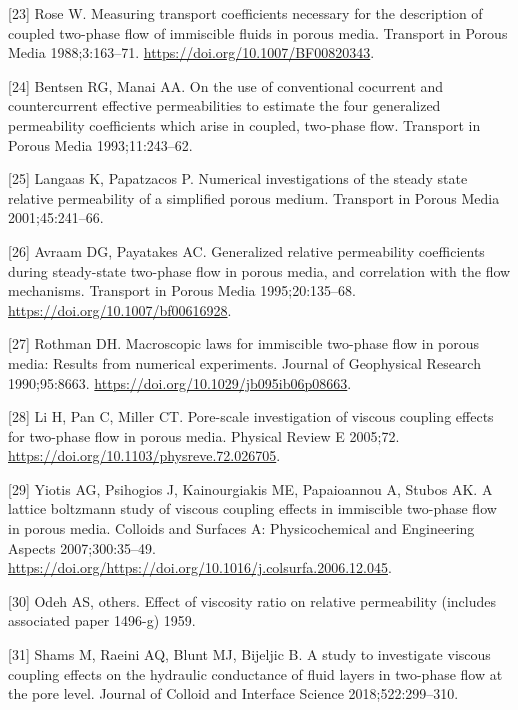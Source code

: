 \documentclass[]{article}
\begin{document}
\leavevmode\hypertarget{ref-Rose1988}{}%
{[}23{]} Rose W. Measuring transport coefficients necessary for the
description of coupled two-phase flow of immiscible fluids in porous
media. Transport in Porous Media 1988;3:163--71.
\url{https://doi.org/10.1007/BF00820343}.

\leavevmode\hypertarget{ref-bentsen1993use}{}%
{[}24{]} Bentsen RG, Manai AA. On the use of conventional cocurrent and
countercurrent effective permeabilities to estimate the four generalized
permeability coefficients which arise in coupled, two-phase flow.
Transport in Porous Media 1993;11:243--62.

\leavevmode\hypertarget{ref-langaas2001numerical}{}%
{[}25{]} Langaas K, Papatzacos P. Numerical investigations of the steady
state relative permeability of a simplified porous medium. Transport in
Porous Media 2001;45:241--66.

\leavevmode\hypertarget{ref-Avraam1995}{}%
{[}26{]} Avraam DG, Payatakes AC. Generalized relative permeability
coefficients during steady-state two-phase flow in porous media, and
correlation with the flow mechanisms. Transport in Porous Media
1995;20:135--68. \url{https://doi.org/10.1007/bf00616928}.

\leavevmode\hypertarget{ref-Rothman1990}{}%
{[}27{]} Rothman DH. Macroscopic laws for immiscible two-phase flow in
porous media: Results from numerical experiments. Journal of Geophysical
Research 1990;95:8663. \url{https://doi.org/10.1029/jb095ib06p08663}.

\leavevmode\hypertarget{ref-Li2005}{}%
{[}28{]} Li H, Pan C, Miller CT. Pore-scale investigation of viscous
coupling effects for two-phase flow in porous media. Physical Review E
2005;72. \url{https://doi.org/10.1103/physreve.72.026705}.

\leavevmode\hypertarget{ref-Yiotis2007}{}%
{[}29{]} Yiotis AG, Psihogios J, Kainourgiakis ME, Papaioannou A, Stubos
AK. A lattice boltzmann study of viscous coupling effects in immiscible
two-phase flow in porous media. Colloids and Surfaces A: Physicochemical
and Engineering Aspects 2007;300:35--49.
\url{https://doi.org/https://doi.org/10.1016/j.colsurfa.2006.12.045}.

\leavevmode\hypertarget{ref-odeh1959effect}{}%
{[}30{]} Odeh AS, others. Effect of viscosity ratio on relative
permeability (includes associated paper 1496-g) 1959.

\leavevmode\hypertarget{ref-shams2018study}{}%
{[}31{]} Shams M, Raeini AQ, Blunt MJ, Bijeljic B. A study to
investigate viscous coupling effects on the hydraulic conductance of
fluid layers in two-phase flow at the pore level. Journal of Colloid and
Interface Science 2018;522:299--310.
\end{document}
